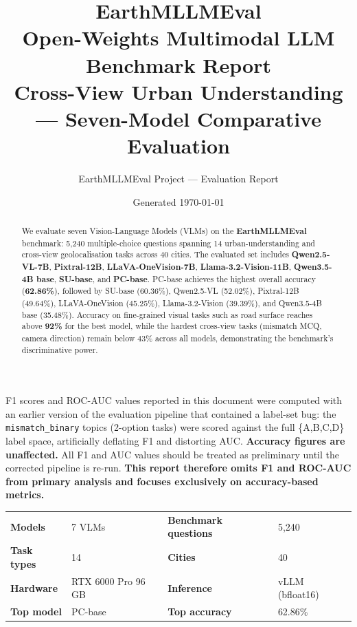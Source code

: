\documentclass[11pt,a4paper]{article}
\title{\vspace{-1.2cm}\textcolor{eollmblue}{\textbf{EarthMLLMEval}}\\
       \large Open-Weights Multimodal LLM Benchmark Report\\
       \normalsize Cross-View Urban Understanding — Seven-Model Comparative Evaluation}
\author{EarthMLLMEval Project --- Evaluation Report}
\date{Generated \today}
\begin{document}
\maketitle
\thispagestyle{empty}
\vspace{-1em}

\begin{abstract}
\noindent
We evaluate seven Vision-Language Models (VLMs) on the
\textbf{EarthMLLMEval} benchmark: 5{,}240 multiple-choice questions spanning
14 urban-understanding and cross-view geolocalisation tasks across 40 cities.
The evaluated set includes \textbf{Qwen2.5-VL-7B}, \textbf{Pixtral-12B},
\textbf{LLaVA-OneVision-7B}, \textbf{Llama-3.2-Vision-11B}, \textbf{Qwen3.5-4B base},
\textbf{SU-base}, and \textbf{PC-base}. PC-base achieves the highest overall
accuracy (\textbf{62.86\%}), followed by SU-base (60.36\%), Qwen2.5-VL
(52.02\%), Pixtral-12B (49.64\%), LLaVA-OneVision (45.25\%), Llama-3.2-Vision
(39.39\%), and Qwen3.5-4B base (35.48\%).
Accuracy on fine-grained visual tasks such as road surface reaches above
\textbf{92\%} for the best model, while the hardest cross-view tasks
(mismatch MCQ, camera direction) remain below 43\% across all models,
demonstrating the benchmark's discriminative power.
\end{abstract}

\begin{warnbox}
F1 scores and ROC-AUC values reported in this document were computed with
an earlier version of the evaluation pipeline that contained a label-set bug:
the \texttt{mismatch\_binary} topics (2-option tasks) were scored against the
full \{A,B,C,D\} label space, artificially deflating F1 and distorting AUC.
\textbf{Accuracy figures are unaffected.} All F1 and AUC values should be
treated as preliminary until the corrected pipeline is re-run.
\textbf{This report therefore omits F1 and ROC-AUC from primary analysis
and focuses exclusively on accuracy-based metrics.}
\end{warnbox}

\vspace{0.5em}

\begin{infobox}[At a glance]
\begin{tabularx}{\linewidth}{@{}lXlX@{}}
\textbf{Models}          & 7 VLMs  & \textbf{Benchmark questions} & 5{,}240 \\
\textbf{Task types}      & 14                   & \textbf{Cities}              & 40 \\
\textbf{Hardware}        & RTX 6000 Pro 96\,GB  & \textbf{Inference}           & vLLM (bfloat16) \\
\textbf{Top model}       & PC-base        & \textbf{Top accuracy}        & 62.86\% \\
\end{tabularx}
\end{infobox}
\end{document}
